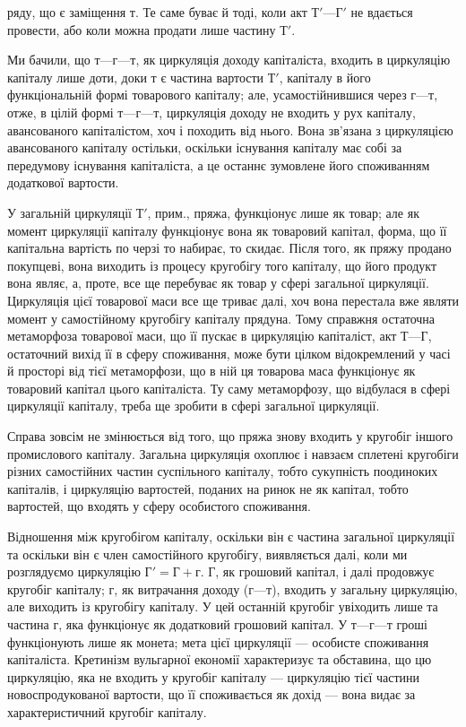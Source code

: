 \parcont{}  %
ряду, що є заміщення $т$. Те саме буває й тоді, коли акт $Т' — Г'$ не
вдається провести, або коли можна продати лише частину $Т'$.

Ми бачили, що $т — г — т$, як циркуляція доходу капіталіста, входить
в циркуляцію капіталу лише доти, доки $т$ є частина вартости $Т'$, капіталу
в його функціональній формі товарового капіталу; але, усамостійнившися
через $г — т$, отже, в цілій формі $т — г — т$, циркуляція доходу не входить
у рух капіталу, авансованого капіталістом, хоч і походить від нього.
Вона зв’язана з циркуляцією авансованого капіталу остільки, оскільки
існування капіталу має собі за передумову існування капіталіста, а це
останнє зумовлене його споживанням додаткової вартости.

У загальній циркуляції $Т'$, прим., пряжа, функціонує лише як товар;
але як момент циркуляції капіталу функціонує вона як товаровий
капітал, форма, що її капітальна вартість по черзі то набирає, то скидає.
Після того, як пряжу продано покупцеві, вона виходить із процесу
кругобігу того капіталу, що його продукт вона являє, а, проте, все ще
перебуває як товар у сфері загальної циркуляції. Циркуляція цієї товарової
маси все ще триває далі, хоч вона перестала вже являти момент
у самостійному кругобігу капіталу прядуна. Тому справжня остаточна
метаморфоза товарової маси, що її пускає в циркуляцію капіталіст, акт
$Т — Г$, остаточний вихід її в сферу споживання, може бути цілком відокремлений
у часі й просторі від тієї метаморфози, що в ній ця товарова
маса функціонує як товаровий капітал цього капіталіста. Ту саму метаморфозу,
що відбулася в сфері циркуляції капіталу, треба ще зробити
в сфері загальної циркуляції.

Справа зовсім не змінюється від того, що пряжа знову входить
у кругобіг іншого промислового капіталу. Загальна циркуляція охоплює
і навзаєм сплетені кругобіги різних самостійних частин суспільного капіталу,
тобто сукупність поодиноких капіталів, і циркуляцію вартостей, поданих
на ринок не як капітал, тобто вартостей, що входять у сферу особистого
споживання.

Відношення між кругобігом капіталу, оскільки він є частина загальної
циркуляції та оскільки він є член самостійного кругобігу, виявляється
далі, коли ми розглядуємо циркуляцію $Г' = Г + г$. $Г$, як грошовий капітал,
і далі продовжує кругобіг капіталу; $г$, як витрачання доходу ($г — т$),
входить у загальну циркуляцію, але виходить із кругобігу капіталу. У цей
останній кругобіг увіходить лише та частина $г$, яка функціонує як додатковий
грошовий капітал. У $т — г — т$ гроші функціонують лише як
монета; мета цієї циркуляції — особисте споживання капіталіста. Кретинізм
вульгарної економії характеризує та обставина, що цю циркуляцію, яка
не входить у кругобіг капіталу — циркуляцію тієї частини новоспродукованої
вартости, що її споживається як дохід — вона видає за характеристичний
кругобіг капіталу.

